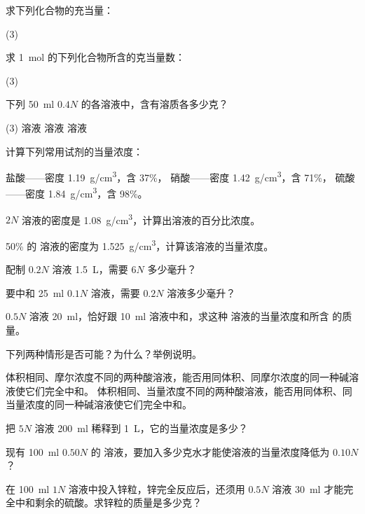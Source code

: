 \begin{Practice}[习题]
\begin{question}
  \item 求下列化合物的充当量：
  \begin{tasks}(3)
    \task {}
    \task {}
    \task {}
  \end{tasks}
  \item 求 \qty{1}{mol} 的下列化合物所含的克当量数：
  \begin{tasks}(3)
    \task {}
    \task {}
    \task {}
  \end{tasks}
  \item 下列 \qty{50}{ml} $0.4N$ 的各溶液中，含有溶质各多少克？
  \begin{tasks}(3)
    \task {} 溶液
    \task {} 溶液
    \task {} 溶液
  \end{tasks}
  \item 计算下列常用试剂的当量浓度：
  \begin{tasks}[label=(\arabic*)]
    \task 盐酸——密度 \qty{1.19}{g/cm^3}，含  37\%，
    \task 硝酸——密度 \qty{1.42}{g/cm^3}，含  71\%，
    \task 硫酸——密度 \qty{1.84}{g/cm^3}，含  98\%。
  \end{tasks}
  \item $2N$  溶液的密度是 \qty{1.08}{g/cm^3}，计算出溶液的百分比浓度。
  \item 50\% 的  溶液的密度为 \qty{1.525}{g/cm^3}，计算该溶液的当量浓度。
  \item 配制 $0.2N$  溶液 \qty{1.5}{L}，需要 $6N$  多少毫升？
  \item 要中和 \qty{25}{ml} $0.1N$  溶液，需要 $0.2N$  溶液多少毫升？
  \item $0.5N$  溶液 \qty{20}{ml}，恰好跟 \qty{10}{ml}  溶液中和，求这种  溶液的当量浓度和所含  的质量。
  \item 下列两种情形是否可能？为什么？举例说明。
  \begin{tasks}[label=(\arabic*)]
    \task 体积相同、摩尔浓度不同的两种酸溶液，能否用同体积、同摩尔浓度的同一种碱溶液使它们完全中和。
    \task 体积相同、当量浓度不同的两种酸溶液，能否用同体积、同当量浓度的同一种碱溶液使它们完全中和。
  \end{tasks}
  \item 把 $5N$  溶液 \qty{200}{ml} 稀释到 \qty{1}{L}，它的当量浓度是多少？
  \item 现有 \qty{100}{ml} $0.50N$ 的  溶液，要加入多少克水才能使溶液的当量浓度降低为 $0.10N$？
  \item 在 \qty{100}{ml} $1N$  溶液中投入锌粒，锌完全反应后，还须用 $0.5N$  溶液 \qty{30}{ml} 才能完全中和剩余的硫酸。求锌粒的质量是多少克？
\end{question}
\end{Practice}

